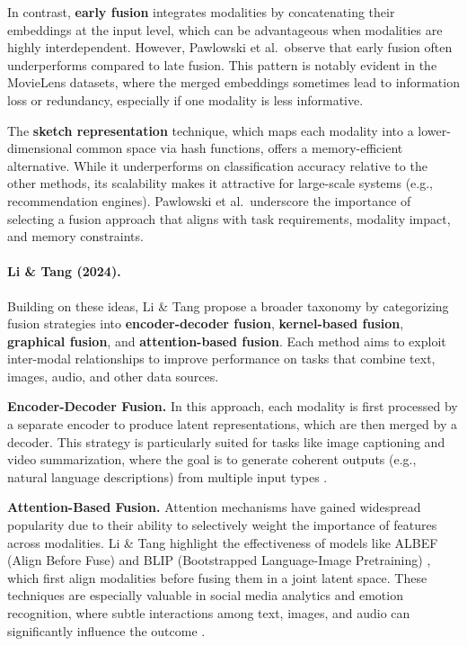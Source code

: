 In contrast, \textbf{early fusion} integrates modalities by concatenating their embeddings at the input level, which can be advantageous when modalities are highly interdependent. However, Pawlowski et al.\ observe that early fusion often underperforms compared to late fusion. This pattern is notably evident in the MovieLens datasets, where the merged embeddings sometimes lead to information loss or redundancy, especially if one modality is less informative.
\newline

The \textbf{sketch representation} technique, which maps each modality into a lower-dimensional common space via hash functions, offers a memory-efficient alternative. While it underperforms on classification accuracy relative to the other methods, its scalability makes it attractive for large-scale systems (e.g., recommendation engines). Pawlowski et al.\ underscore the importance of selecting a fusion approach that aligns with task requirements, modality impact, and memory constraints.

\paragraph{Li \& Tang (2024).}
Building on these ideas, Li \& Tang propose a broader taxonomy by categorizing fusion strategies into \textbf{encoder-decoder fusion}, \textbf{kernel-based fusion}, \textbf{graphical fusion}, and \textbf{attention-based fusion}. Each method aims to exploit inter-modal relationships to improve performance on tasks that combine text, images, audio, and other data sources.
\newline

\textbf{Encoder-Decoder Fusion.} In this approach, each modality is first processed by a separate encoder to produce latent representations, which are then merged by a decoder. This strategy is particularly suited for tasks like image captioning and video summarization, where the goal is to generate coherent outputs (e.g., natural language descriptions) from multiple input types \cite{8269806}.
\newline

\textbf{Attention-Based Fusion.} Attention mechanisms have gained widespread popularity due to their ability to selectively weight the importance of features across modalities. Li \& Tang highlight the effectiveness of models like ALBEF (Align Before Fuse) and BLIP (Bootstrapped Language-Image Pretraining) \cite{li2021alignfusevisionlanguage, li2022blipbootstrappinglanguageimagepretraining}, which first align modalities before fusing them in a joint latent space. These techniques are especially valuable in social media analytics and emotion recognition, where subtle interactions among text, images, and audio can significantly influence the outcome \cite{poria_review_2017}.

